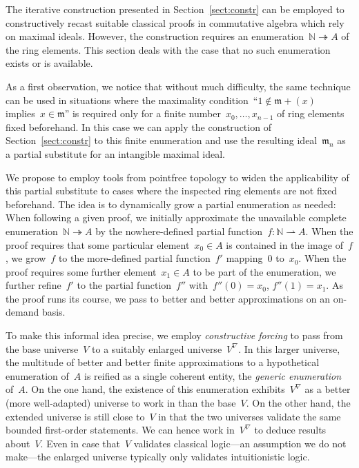 \documentclass[com,11pt,crcready]{iosart2x}
\theoremstyle{definition}
\theoremstyle{plain}
\theoremstyle{remark}
\newcommand{\?}{\,{:}\,}
\newcommand{\mmm}{\mathfrak{m}}
\newcommand{\NN}{\mathbb{N}}
\renewcommand{\_}{\mathpunct{.}\,}
\begin{document}
The iterative construction presented in Section~\ref{sect:constr}
can be employed to constructively recast suitable classical proofs in
commutative algebra which rely on maximal ideals. However, the construction requires an enumeration~$\NN
\twoheadrightarrow A$ of the ring elements. This section deals with the case
that no such enumeration exists or is available.

As a first observation, we notice that without much difficulty, the same technique can be used in situations where the
maximality condition~``$1 \not\in \mmm + (x)$ implies~$x \in \mmm$''
is required only for a finite number~$x_0,\ldots,x_{n-1}$ of ring elements
fixed beforehand. In this case we can apply the construction of Section~\ref{sect:constr} to
this finite enumeration and use the resulting ideal~$\mmm_n$ as a partial
substitute for an intangible maximal ideal.

We propose to employ tools from pointfree topology to
widen the applicability of this partial
substitute to cases where the inspected ring elements are
not fixed beforehand. The idea is to dynamically grow a partial enumeration as
needed: When following a given proof, we initially approximate the unavailable
complete enumeration~$\NN \twoheadrightarrow A$ by the nowhere-defined partial
function~$f : \NN \rightharpoonup A$. When the proof requires
that some particular element~$x_0 \in A$ is contained in the image of~$f$, we grow~$f$ to
the more-defined partial function~$f'$ mapping~$0$ to~$x_0$. When the proof
requires some further element~$x_1 \in A$ to be part of the enumeration, we further refine~$f'$
to the partial function~$f''$ with~$f''(0) = x_0$, $f''(1) = x_1$.
As the proof runs its course, we pass to better and better approximations on an
on-demand basis.

To make this informal idea precise, we employ \emph{constructive forcing} to
pass from the base universe~$V$ to a suitably enlarged universe~$V^\nabla$. In
this larger universe, the multitude of better and better finite approximations to a
hypothetical enumeration of~$A$ is reified as a single coherent entity, the
\emph{generic enumeration} of~$A$. On the one hand, the existence of this enumeration
exhibits~$V^\nabla$ as a better (more well-adapted) universe to work in than the
base~$V$. On the other hand, the extended universe is still close to~$V$ in that the two universes
validate the same bounded first-order statements. We can hence work in~$V^\nabla$ to
deduce results about~$V$. Even in case that~$V$ validates classical logic---an
assumption we do not make---the enlarged universe typically only validates
intuitionistic logic.
\end{document}
